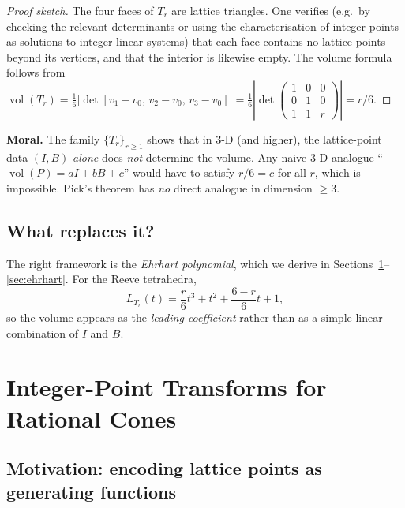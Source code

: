 \documentclass[11pt]{article}
\theoremstyle{plain}
\theoremstyle{definition}
\begin{document}
\begin{proof}[Proof sketch]
  The four faces of $T_r$ are lattice triangles.  One verifies (e.g.\ by
  checking the relevant determinants or using the characterisation of integer
  points as solutions to integer linear systems) that each face contains no
  lattice points beyond its vertices, and that the interior is likewise empty.
  The volume formula follows from $\operatorname{vol}(T_r)
  = \tfrac{1}{6}|\det[v_1-v_0,\, v_2-v_0,\, v_3-v_0]|
  = \tfrac{1}{6}|\det\begin{pmatrix}1&0&0\\0&1&0\\1&1&r\end{pmatrix}|
  = r/6$.
\end{proof}

\begin{keybox}
\textbf{Moral.}  The family $\{T_r\}_{r \geq 1}$ shows that in 3-D (and
higher), the lattice-point data $(I, B)$ \emph{alone} does \emph{not}
determine the volume.  Any naive 3-D analogue
``$\operatorname{vol}(P) = aI + bB + c$'' would have to satisfy
$r/6 = c$ for all $r$, which is impossible.  Pick's theorem has \emph{no}
direct analogue in dimension $\geq 3$.
\end{keybox}

\subsection{What replaces it?}

The right framework is the \emph{Ehrhart polynomial}, which we derive in
Sections~\ref{sec:ipt}--\ref{sec:ehrhart}.  For the Reeve tetrahedra,
\[
  L_{T_r}(t) = \frac{r}{6}t^3 + t^2 + \frac{6-r}{6}t + 1,
\]
so the volume appears as the \emph{leading coefficient} rather than as a
simple linear combination of $I$ and $B$.

\section{Integer-Point Transforms for Rational Cones}
\label{sec:ipt}

\subsection{Motivation: encoding lattice points as generating functions}
\end{document}
